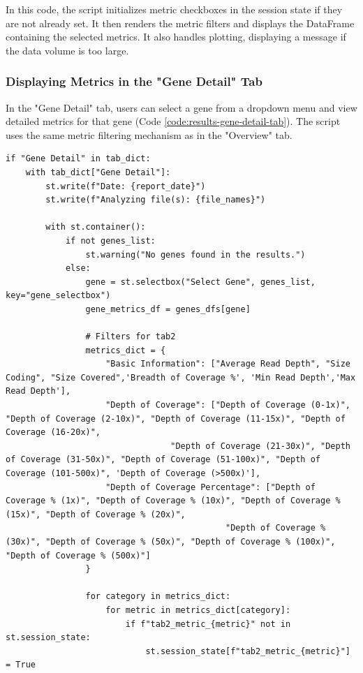 In this code, the script initializes metric checkboxes in the session state if they are not already set. It then renders the metric filters and displays the DataFrame containing the selected metrics. It also handles plotting, displaying a message if the data volume is too large.

\subsubsection{\textbf{Displaying Metrics in the "Gene Detail" Tab}}

In the "Gene Detail" tab, users can select a gene from a dropdown menu and view detailed metrics for that gene (Code \ref{code:results-gene-detail-tab}). The script uses the same metric filtering mechanism as in the "Overview" tab.

\begin{longlisting}
\begin{verbatim}
if "Gene Detail" in tab_dict:
    with tab_dict["Gene Detail"]:
        st.write(f"Date: {report_date}")
        st.write(f"Analyzing file(s): {file_names}")
        
        with st.container():
            if not genes_list:
                st.warning("No genes found in the results.")
            else:
                gene = st.selectbox("Select Gene", genes_list, key="gene_selectbox")
                gene_metrics_df = genes_dfs[gene]

                # Filters for tab2
                metrics_dict = {
                    "Basic Information": ["Average Read Depth", "Size Coding", "Size Covered",'Breadth of Coverage %', 'Min Read Depth','Max Read Depth'],
                    "Depth of Coverage": ["Depth of Coverage (0-1x)", "Depth of Coverage (2-10x)", "Depth of Coverage (11-15x)", "Depth of Coverage (16-20x)",
                                 "Depth of Coverage (21-30x)", "Depth of Coverage (31-50x)", "Depth of Coverage (51-100x)", "Depth of Coverage (101-500x)", 'Depth of Coverage (>500x)'],
                    "Depth of Coverage Percentage": ["Depth of Coverage % (1x)", "Depth of Coverage % (10x)", "Depth of Coverage % (15x)", "Depth of Coverage % (20x)",
                                            "Depth of Coverage % (30x)", "Depth of Coverage % (50x)", "Depth of Coverage % (100x)", "Depth of Coverage % (500x)"]
                }

                for category in metrics_dict:
                    for metric in metrics_dict[category]:
                        if f"tab2_metric_{metric}" not in st.session_state:
                            st.session_state[f"tab2_metric_{metric}"] = True


\end{verbatim}
\end{longlisting}
